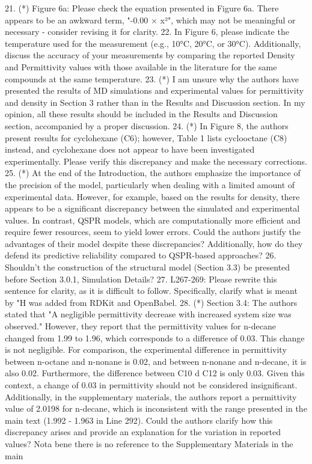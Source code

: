 \documentclass{article}
\begin{document}
21.     (*) Figure 6a: Please check the equation presented in Figure 6a. There appears to be an awkward term, "-0.00 × x²", which may not be meaningful or necessary - consider revising it for clarity.
22.     In Figure 6, please indicate the temperature used for the measurement (e.g., 10°C, 20°C, or 30°C). Additionally, discuss the accuracy of your measurements by comparing the reported Density and Permittivity values with those available in the literature for the same compounds at the same temperature.
23.     (*) I am unsure why the authors have presented the results of MD simulations and experimental values for permittivity and density in Section 3 rather than in the Results and Discussion section. In my opinion, all these results should be included in the Results and Discussion section, accompanied by a proper discussion.
24.     (*) In Figure 8, the authors present results for cyclohexane (C6); however, Table 1 lists cyclooctane (C8) instead, and cyclohexane does not appear to have been investigated experimentally. Please verify this discrepancy and make the necessary corrections.
25.     (*) At the end of the Introduction, the authors emphasize the importance of the precision of the model, particularly when dealing with a limited amount of experimental data. However, for example, based on the results for density, there appears to be a significant discrepancy between the simulated and experimental values. In contrast, QSPR models, which are computationally more efficient and require fewer resources, seem to yield lower errors. Could the authors justify the advantages of their model despite these discrepancies? Additionally, how do they defend its predictive reliability compared to QSPR-based approaches?
26.     Shouldn't the construction of the structural model (Section 3.3) be presented before Section 3.0.1, Simulation Details?
27.     L267-269: Please rewrite this sentence for clarity, as it is difficult to follow. Specifically, clarify what is meant by "H was added from RDKit and OpenBabel.
28.     (*) Section 3.4: The authors stated that "A negligible permittivity decrease with increased system size was observed." However, they report that the permittivity values for n-decane changed from 1.99 to 1.96, which corresponds to a difference of 0.03. This change is not negligible. For comparison, the experimental difference in permittivity between n-octane and n-nonane is 0.02, and between n-nonane and n-decane, it is also 0.02. Furthermore, the difference between C10 d C12 is only 0.03. Given this context, a change of 0.03 in permittivity should not be considered insignificant. Additionally, in the supplementary materials, the authors report a permittivity value of 2.0198 for n-decane, which is inconsistent with the range presented in the main text (1.992 - 1.963 in Line 292). Could the authors clarify how this discrepancy arises and provide an explanation for the variation in reported values? Nota bene there is no reference to the Supplementary Materials in the main
\end{document}
